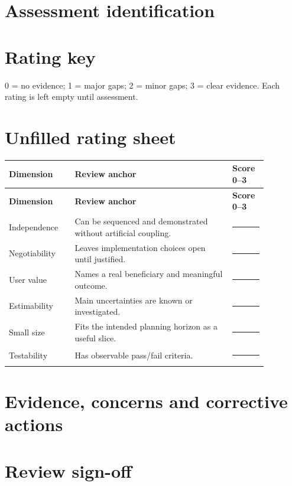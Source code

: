 \documentclass[11pt,letterpaper]{article}
\begin{document}
\section{Assessment identification}
\section{Rating key}
0 = no evidence; 1 = major gaps; 2 = minor gaps; 3 = clear evidence. Each rating is left empty until assessment.

\section{Unfilled rating sheet}
\begin{longtable}{|p{0.22\linewidth}|p{0.53\linewidth}|p{0.12\linewidth}|}\hline
\textbf{Dimension} & \textbf{Review anchor} & \textbf{Score 0--3} \\ \hline\endfirsthead
\textbf{Dimension} & \textbf{Review anchor} & \textbf{Score 0--3} \\ \hline\endhead
Independence & Can be sequenced and demonstrated without artificial coupling. & \rule{0.4in}{0.35pt} \\ \hline
Negotiability & Leaves implementation choices open until justified. & \rule{0.4in}{0.35pt} \\ \hline
User value & Names a real beneficiary and meaningful outcome. & \rule{0.4in}{0.35pt} \\ \hline
Estimability & Main uncertainties are known or investigated. & \rule{0.4in}{0.35pt} \\ \hline
Small size & Fits the intended planning horizon as a useful slice. & \rule{0.4in}{0.35pt} \\ \hline
Testability & Has observable pass/fail criteria. & \rule{0.4in}{0.35pt} \\ \hline
\end{longtable}
\section{Evidence, concerns and corrective actions}
\section{Review sign-off}
\end{document}
